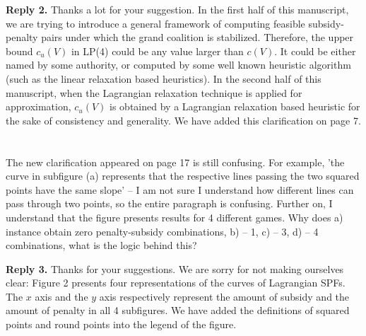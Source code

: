 \documentclass[11pt]{article}
\begin{document}
\noindent \textbf{Reply 2.}
Thanks a lot for your suggestion.
In the first half of this manuscript, we are trying to introduce a general framework of computing feasible subsidy-penalty pairs under which the grand coalition is stabilized.
Therefore, the upper bound $c_u(V)$ in LP(4) could be any value larger than $c(V)$.
It could be either named by some authority, or computed by some well known heuristic algorithm (such as the linear relaxation based heuristics).
In the second half of this manuscript, when the Lagrangian relaxation technique is applied for approximation, $c_u(V)$ is obtained by a Lagrangian relaxation based heuristic for the sake of consistency and generality. We have added this clarification on page 7.
~\\[4mm]

~\\[2mm]

The new clarification appeared on page 17 is still confusing. For example, 'the curve in subfigure (a) represents that the respective lines passing the two squared points have the same slope' -- I am not sure I understand how different lines can pass through two points, so the entire paragraph is confusing. Further on, I understand that the figure presents results for 4 different games. Why does a) instance obtain zero penalty-subsidy combinations, b) -- 1, c) -- 3, d) -- 4 combinations, what is the logic behind this?

\noindent \textbf{Reply 3.}
Thanks for your suggestions.
We are sorry for not making ourselves clear:
Figure 2 presents four representations of the curves of Lagrangian SPFs. The $x$ axis and the $y$ axis respectively represent the amount of subsidy and the amount of penalty in all 4 subfigures. We have added the definitions of squared points and round points into the legend of the figure.
\end{document}
